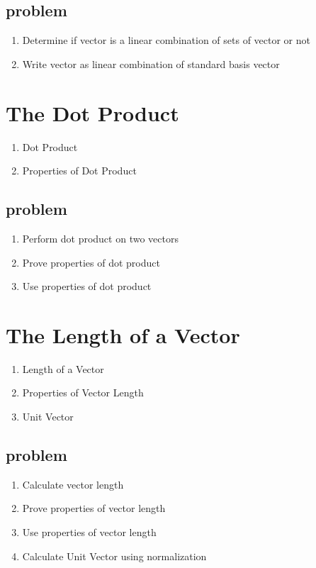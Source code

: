 \documentclass{article}
\begin{document}
\subsection{problem}
\begin{enumerate}
    \item Determine if vector is a linear combination of sets of vector or
	not
    \item Write vector as linear combination of standard basis vector
\end{enumerate}

\section{The Dot Product}

\begin{enumerate}
    \item Dot Product
    \item Properties of Dot Product
\end{enumerate}

\subsection{problem}
\begin{enumerate}
    \item Perform dot product on two vectors
    \item Prove properties of dot product
    \item Use properties of dot product
\end{enumerate}

\section{The Length of a Vector}

\begin{enumerate}
    \item Length of a Vector
    \item Properties of Vector Length
    \item Unit Vector
\end{enumerate}

\subsection{problem}
\begin{enumerate}
    \item Calculate vector length
    \item Prove properties of vector length
    \item Use properties of vector length
    \item Calculate Unit Vector using normalization
\end{enumerate}
\end{document}
